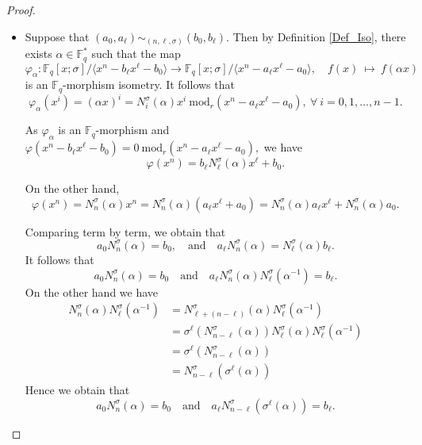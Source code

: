 \documentclass[12pt,paper]{article}
\theoremstyle{plain}
\newcommand{\Fq}{\mathbb{F}_{q}}
\begin{document}
\begin{proof}\;
\begin{itemize}
    \item[(1) $\Rightarrow$ (2):]
   Suppose that $(a_0, a_{\ell}) \sim_{(n,\ell,\sigma)} (b_0, b_{\ell})$. Then by Definition \ref{Def_Iso}, there exists $\alpha \in \mathbb{F}_q^*$ such that the map
    $$
    \varphi_{\alpha} : \Fq[x;\sigma] /\langle x^n - b_{\ell} x^{\ell} - b_0 \rangle \to \Fq[x;\sigma] /\langle x^n - a_{\ell} x^{\ell} - a_0 \rangle, \quad f(x) \ \mapsto \ f(\alpha x)
    $$
    is an  $\mathbb{F}_q$-morphism isometry.  It follows that
$$ 
\varphi_{\alpha}(x^i)= (\alpha x)^i= N_i^{\sigma}(\alpha) x^{ i}\ \text{mod}_r (x^n-a_{\ell} x^{\ell}-a_0), \ \forall  \ i=0,1, \ldots, n-1.
$$

As $\varphi_{\alpha}$ is an $\Fq$-morphism and  $ \varphi(x^n-b_{\ell}x^{\ell}-b_0)=0 \ \text{mod}_r (x^n- a_{\ell} x^{\ell}-a_0) ,$ we have
\begin{equation}
\varphi( x^n)=   b_{\ell}  N_{\ell}^{\sigma}(\alpha) x^{\ell} +b_0.
 \end{equation}

On the other hand,
\begin{equation}
\varphi( x^n)=  N_n^{\sigma}(\alpha) x^n= N_n^{\sigma}(\alpha) ( a_{\ell}x^{\ell}+a_0) = N_n^{\sigma}(\alpha) a_{\ell} x^{\ell}+ N_n^{\sigma}(\alpha) a_0.
\end{equation}


Comparing term by term, we obtain  that $$ a_0 N_n^{\sigma}(\alpha)  = b_0, \quad    \text{and} \quad   a_{\ell} N_n^{\sigma}(\alpha) =  N_{\ell}^{\sigma}(\alpha) b_{\ell}. $$ It follows that
$$ a_0 N_n^{\sigma}(\alpha)  = b_0   \quad  \text{and} \quad   a_{\ell} N_n^{\sigma}(\alpha)  N_{\ell}^{\sigma}(\alpha^{-1})=  b_{\ell}. $$
 On the other hand we have 
\begin{equation}\label{Eq_formulae}
\begin{array}{rl}
    N_n^{\sigma}(\alpha) N_{\ell}^{\sigma}(\alpha^{-1})  & =  N_{\ell+(n-\ell)}^{\sigma}(\alpha) N_{\ell}^{\sigma}(\alpha^{-1})\\
     &=   \sigma^{\ell}(N_{n-\ell}^{\sigma}(\alpha)) N^{\sigma}_{\ell}(\alpha) N_{\ell}^{\sigma}(\alpha^{-1})  \\
     &=  \sigma^{\ell}(N^{\sigma}_{n-\ell}(\alpha))\\
     & = N^{\sigma}_{n-\ell}(\sigma^{\ell}(\alpha))
\end{array}
\end{equation}
Hence we obtain that 
$$ a_0 N_n^{\sigma}(\alpha)  = b_0   \quad  \text{and} \quad   a_{\ell} N^{\sigma}_{n-\ell}(\sigma^{\ell}(\alpha))=  b_{\ell}. $$
 


\end{itemize}
\end{proof}
\end{document}
